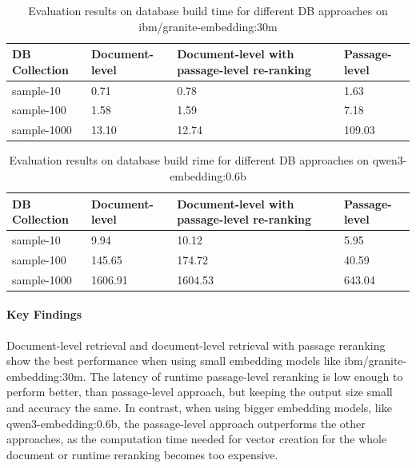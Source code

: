 \begin{table}[h]
  \centering
    \caption{Evaluation results on database build time for different DB approaches on ibm/granite-embedding:30m}
  \scriptsize
    \begin{tabularx}{\textwidth}{lYYY}
    \toprule
    \textbf{DB Collection} & \textbf{Document-level} &
    \textbf{Document-level with passage-level re-ranking} & \textbf{Passage-level} \\
    \midrule
    sample-10   & 0.71 & 0.78 & 1.63 \\
    sample-100  & 1.58 & 1.59 & 7.18 \\
    sample-1000 & 13.10 & 12.74 & 109.03 \\
    \bottomrule
  \end{tabularx}\label{tab:eval-41-results}
\end{table}

\begin{table}[h]
  \centering
    \caption{Evaluation results on database build rime for different DB approaches on qwen3-embedding:0.6b}
  \scriptsize
    \begin{tabularx}{\textwidth}{lYYY}
    \toprule
    \textbf{DB Collection} & \textbf{Document-level} &
    \textbf{Document-level with passage-level re-ranking} & \textbf{Passage-level} \\
    \midrule
    sample-10   & 9.94 & 10.12 & 5.95 \\
    sample-100  & 145.65 & 174.72 & 40.59 \\
    sample-1000 & 1606.91 & 1604.53 & 643.04 \\
    \bottomrule
  \end{tabularx}\label{tab:eval-42-results}
\end{table}

\paragraph{Key Findings}
Document-level retrieval and document-level retrieval with passage reranking
show the best performance when using small embedding models like
ibm/granite-embedding:30m. The latency of runtime passage-level reranking is low
enough to perform better, than passage-level approach, but keeping the output
size small and accuracy the same. In contrast, when using bigger embedding
models, like qwen3-embedding:0.6b, the passage-level approach outperforms the
other approaches, as the computation time needed for vector creation for
the whole document or runtime reranking becomes too expensive.


